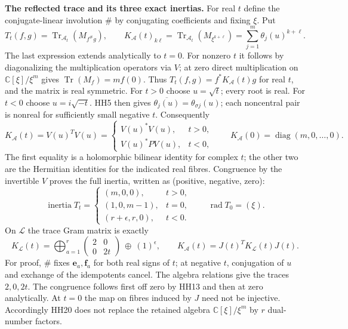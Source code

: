 \HH\textbf{The reflected trace and its three exact inertias.}
For real $t$ define the conjugate-linear involution $\#$ by conjugating
coefficients and fixing $\xi$. Put
\[
 T_t(f,g)=\operatorname{Tr}_{\mathcal A_t}
                    (M_{f^\#g}),\qquad
 K_{\mathcal A}(t)_{k\ell}
       =\operatorname{Tr}_{\mathcal A_t}(M_{\xi^{k+\ell}})
       =\sum_{j=1}^m\theta_j(u)^{k+\ell}.
 \tag{HH17}\label{hh:trace}
\]
The last expression extends analytically to $t=0$. For nonzero $t$
it follows by diagonalizing the multiplication operators via $V$;
at zero direct multiplication on $\mathbb C[\xi]/\xi^m$ gives
$\operatorname{Tr}(M_f)=mf(0)$.
Thus $T_t(f,g)=f^*K_{\mathcal A}(t)g$ for real $t$, and the matrix
is real symmetric. For $t>0$ choose $u=\sqrt t$; every root is real.
For $t<0$ choose $u=i\sqrt{-t}$. HH5 then gives
$\overline{\theta_j(u)}=\theta_{\sigma j}(u)$; each noncentral
pair is nonreal for sufficiently small negative $t$. Consequently
\[
 K_{\mathcal A}(t)=V(u)^TV(u)
   =\begin{cases}
     V(u)^*V(u),&t>0,\\
     V(u)^*P V(u),&t<0,
    \end{cases}
 \qquad K_{\mathcal A}(0)=\operatorname{diag}(m,0,\ldots,0).
 \tag{HH18}\label{hh:gram}
\]
The first equality is a holomorphic bilinear identity for complex $t$;
the other two are the Hermitian identities for the indicated real
fibres. Congruence by the invertible $V$ proves the full inertia,
written as (positive, negative, zero):
\[
 \operatorname{inertia}T_t=
 \begin{cases}
  (m,0,0),&t>0,\\
  (1,0,m-1),&t=0,\\
  (r+\epsilon,r,0),&t<0 .
 \end{cases}
 \qquad \operatorname{rad}T_0=(\xi).
 \tag{HH19}\label{hh:inertia}
\]
On $\mathcal L$ the trace Gram matrix is exactly
\[
 K_{\mathcal L}(t)=
       \bigoplus_{a=1}^r\begin{pmatrix}2&0\\0&2t\end{pmatrix}
            \ \oplus\ (1)^\epsilon,\qquad
 K_{\mathcal A}(t)=J(t)^T K_{\mathcal L}(t)J(t).
 \tag{HH20}\label{hh:auxgram}
\]
For proof, $\#$ fixes $\mathbf e_a,\mathbf f_a$ for both real signs
of $t$; at negative $t$, conjugation of $u$ and exchange of the
idempotents cancel. The algebra relations give the traces $2,0,2t$.
The congruence follows first off zero by HH13 and then at zero
analytically. At $t=0$ the map on fibres induced by $J$ need not be
injective. Accordingly HH20 does not replace the retained algebra
$\mathbb C[\xi]/\xi^m$ by $r$ dual-number factors.

